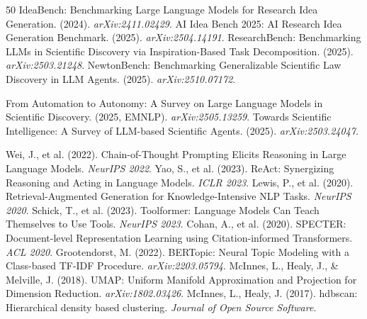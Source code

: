 \documentclass[10pt,a4paper]{article}
\begin{document}
\begin{thebibliography}{50}
 IdeaBench: Benchmarking Large Language Models for Research Idea Generation. (2024). \textit{arXiv:2411.02429}.
 AI Idea Bench 2025: AI Research Idea Generation Benchmark. (2025). \textit{arXiv:2504.14191}.
 ResearchBench: Benchmarking LLMs in Scientific Discovery via Inspiration-Based Task Decomposition. (2025). \textit{arXiv:2503.21248}.
 NewtonBench: Benchmarking Generalizable Scientific Law Discovery in LLM Agents. (2025). \textit{arXiv:2510.07172}.

 From Automation to Autonomy: A Survey on Large Language Models in Scientific Discovery. (2025, EMNLP). \textit{arXiv:2505.13259}.
 Towards Scientific Intelligence: A Survey of LLM-based Scientific Agents. (2025). \textit{arXiv:2503.24047}.

 Wei, J., et al. (2022). Chain-of-Thought Prompting Elicits Reasoning in Large Language Models. \textit{NeurIPS 2022}.
 Yao, S., et al. (2023). ReAct: Synergizing Reasoning and Acting in Language Models. \textit{ICLR 2023}.
 Lewis, P., et al. (2020). Retrieval-Augmented Generation for Knowledge-Intensive NLP Tasks. \textit{NeurIPS 2020}.
 Schick, T., et al. (2023). Toolformer: Language Models Can Teach Themselves to Use Tools. \textit{NeurIPS 2023}.
 Cohan, A., et al. (2020). SPECTER: Document-level Representation Learning using Citation-informed Transformers. \textit{ACL 2020}.
 Grootendorst, M. (2022). BERTopic: Neural Topic Modeling with a Class-based TF-IDF Procedure. \textit{arXiv:2203.05794}.
 McInnes, L., Healy, J., \& Melville, J. (2018). UMAP: Uniform Manifold Approximation and Projection for Dimension Reduction. \textit{arXiv:1802.03426}.
 McInnes, L., Healy, J. (2017). hdbscan: Hierarchical density based clustering. \textit{Journal of Open Source Software}.


\end{thebibliography}
\end{document}
